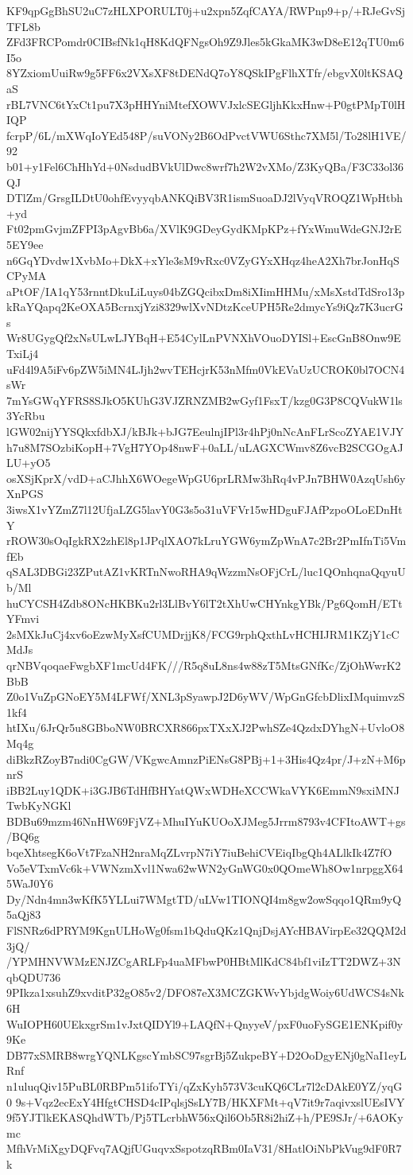 KF9qpGgBhSU2uC7zHLXPORULT0j+u2xpn5ZqfCAYA/RWPnp9+p/+RJeGvSjTFL8b
ZFd3FRCPomdr0CIBsfNk1qH8KdQFNgsOh9Z9Jles5kGkaMK3wD8eE12qTU0m6I5o
8YZxiomUuiRw9g5FF6x2VXsXF8tDENdQ7oY8QSkIPgFlhXTfr/ebgvX0ltKSAQaS
rBL7VNC6tYxCt1pu7X3pHHYniMtefXOWVJxlcSEGljhKkxHnw+P0gtPMpT0lHIQP
fcrpP/6L/mXWqIoYEd548P/suVONy2B6OdPvctVWU6Sthc7XM5l/To28lH1VE/92
b01+y1Fel6ChHhYd+0NsdudBVkUlDwc8wrf7h2W2vXMo/Z3KyQBa/F3C33ol36QJ
DTlZm/GrsgILDtU0ohfEvyyqbANKQiBV3R1ismSuoaDJ2lVyqVROQZ1WpHtbh+yd
Ft02pmGvjmZFPI3pAgvBb6a/XVlK9GDeyGydKMpKPz+fYxWmuWdeGNJ2rE5EY9ee
n6GqYDvdw1XvbMo+DkX+xYle3sM9vRxc0VZyGYxXHqz4heA2Xh7brJonHqSCPyMA
aPtOF/IA1qY53rnntDkuLiLuys04bZGQcibxDm8iXIimHHMu/xMsXstdTdSro13p
kRaYQapq2KeOXA5BcrnxjYzi8329wlXvNDtzKceUPH5Re2dmycYs9iQz7K3ucrGs
Wr8UGygQf2xNsULwLJYBqH+E54CylLnPVNXhVOuoDYISl+EscGnB8Onw9ETxiLj4
uFd4l9A5iFv6pZW5iMN4LJjh2wvTEHcjrK53nMfm0VkEVaUzUCROK0bl7OCN4sWr
7mYsGWqYFRS8SJkO5KUhG3VJZRNZMB2wGyf1FsxT/kzg0G3P8CQVukW1ls3YcRbu
lGW02nijYYSQkxfdbXJ/kBJk+bJG7EeulnjIPl3r4hPj0nNcAnFLrScoZYAE1VJY
h7u8M7SOzbiKopH+7VgH7YOp48nwF+0aLL/uLAGXCWmv8Z6vcB2SCGOgAJLU+yO5
osXSjKprX/vdD+aCJhhX6WOegeWpGU6prLRMw3hRq4vPJn7BHW0AzqUsh6yXnPGS
3iwsX1vYZmZ7l12UfjaLZG5lavY0G3s5o31uVFVr15wHDguFJAfPzpoOLoEDnHtY
rROW30sOqIgkRX2zhEl8p1JPqlXAO7kLruYGW6ymZpWnA7c2Br2PmIfnTi5VmfEb
qSAL3DBGi23ZPutAZ1vKRTnNwoRHA9qWzzmNsOFjCrL/luc1QOnhqnaQqyuUb/Ml
huCYCSH4Zdb8ONcHKBKu2rl3LlBvY6lT2tXhUwCHYnkgYBk/Pg6QomH/ETtYFmvi
2sMXkJuCj4xv6oEzwMyXsfCUMDrjjK8/FCG9rphQxthLvHCHIJRM1KZjY1cCMdJs
qrNBVqoqaeFwgbXF1mcUd4FK///R5q8uL8ns4w88zT5MtsGNfKc/ZjOhWwrK2BbB
Z0o1VuZpGNoEY5M4LFWf/XNL3pSyawpJ2D6yWV/WpGnGfcbDlixIMquimvzS1kf4
htIXu/6JrQr5u8GBboNW0BRCXR866pxTXxXJ2PwhSZe4QzdxDYhgN+UvloO8Mq4g
diBkzRZoyB7ndi0CgGW/VKgwcAmnzPiENsG8PBj+1+3His4Qz4pr/J+zN+M6pnrS
iBB2Luy1QDK+i3GJB6TdHfBHYatQWxWDHeXCCWkaVYK6EmmN9sxiMNJTwbKyNGKl
BDBu69mzm46NnHW69FjVZ+MhuIYuKUOoXJMeg5Jrrm8793v4CFItoAWT+gs/BQ6g
bqeXhtsegK6oVt7FzaNH2nraMqZLvrpN7iY7iuBehiCVEiqIbgQh4ALlkIk4Z7fO
Vo5eVTxmVc6k+VWNzmXvl1Nwa62wWN2yGnWG0x0QOmeWh8Ow1nrpggX645WaJ0Y6
Dy/Ndn4mn3wKfK5YLLui7WMgtTD/uLVw1TIONQI4m8gw2owSqqo1QRm9yQ5aQj83
FlSNRz6dPRYM9KgnULHoWg0fsm1bQduQKz1QnjDsjAYcHBAVirpEe32QQM2d3jQ/
/YPMHNVWMzENJZCgARLFp4uaMFbwP0HBtMlKdC84bf1viIzTT2DWZ+3NqbQDU736
9PIkza1xsuhZ9xvditP32gO85v2/DFO87eX3MCZGKWvYbjdgWoiy6UdWCS4sNk6H
WuIOPH60UEkxgrSm1vJxtQIDYl9+LAQfN+QnyyeV/pxF0uoFySGE1ENKpif0y9Ke
DB77xSMRB8wrgYQNLKgscYmbSC97sgrBj5ZukpeBY+D2OoDgyENj0gNaI1eyLRnf
n1uluqQiv15PuBL0RBPm51ifoTYi/qZxKyh573V3cuKQ6CLr7l2cDAkE0YZ/yqG0
9s+Vqz2ecExY4HfgtCHSD4cIPqlsjSsLY7B/HKXFMt+qV7it9r7aqivxslUEsIVY
9f5YJTlkEKASQhdWTb/Pj5TLcrbhW56xQil6Ob5R8i2hiZ+h/PE9SJr/+6AOKymc
MfhVrMiXgyDQFvq7AQjfUGuqvxSspotzqRBm0IaV31/8HatlOiNbPkVug9dF0R7k
